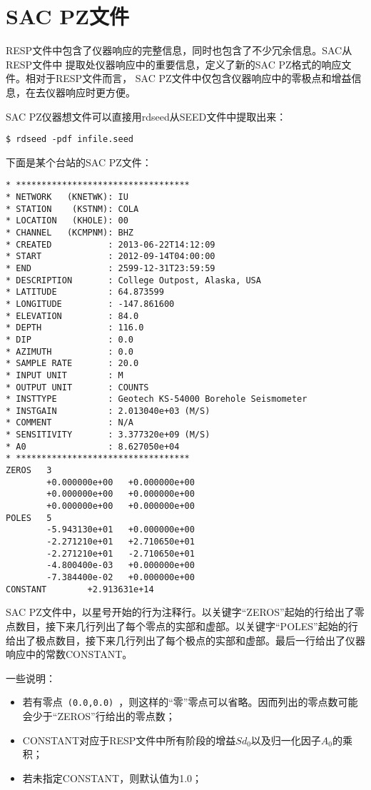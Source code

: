 \section{SAC PZ文件}
RESP文件中包含了仪器响应的完整信息，同时也包含了不少冗余信息。SAC从RESP文件中
提取处仪器响应中的重要信息，定义了新的SAC PZ格式的响应文件。相对于RESP文件而言，
SAC PZ文件中仅包含仪器响应中的零极点和增益信息，在去仪器响应时更方便。

SAC PZ仪器想文件可以直接用rdseed从SEED文件中提取出来：
\begin{verbatim}
$ rdseed -pdf infile.seed
\end{verbatim}

下面是某个台站的SAC PZ文件：
\begin{verbatim}
* **********************************
* NETWORK   (KNETWK): IU
* STATION    (KSTNM): COLA
* LOCATION   (KHOLE): 00
* CHANNEL   (KCMPNM): BHZ
* CREATED           : 2013-06-22T14:12:09
* START             : 2012-09-14T04:00:00
* END               : 2599-12-31T23:59:59
* DESCRIPTION       : College Outpost, Alaska, USA
* LATITUDE          : 64.873599
* LONGITUDE         : -147.861600
* ELEVATION         : 84.0
* DEPTH             : 116.0
* DIP               : 0.0
* AZIMUTH           : 0.0
* SAMPLE RATE       : 20.0
* INPUT UNIT        : M
* OUTPUT UNIT       : COUNTS
* INSTTYPE          : Geotech KS-54000 Borehole Seismometer
* INSTGAIN          : 2.013040e+03 (M/S)
* COMMENT           : N/A
* SENSITIVITY       : 3.377320e+09 (M/S)
* A0                : 8.627050e+04
* **********************************
ZEROS   3
        +0.000000e+00   +0.000000e+00
        +0.000000e+00   +0.000000e+00
        +0.000000e+00   +0.000000e+00
POLES   5
        -5.943130e+01   +0.000000e+00
        -2.271210e+01   +2.710650e+01
        -2.271210e+01   -2.710650e+01
        -4.800400e-03   +0.000000e+00
        -7.384400e-02   +0.000000e+00
CONSTANT        +2.913631e+14
\end{verbatim}

SAC PZ文件中，以星号开始的行为注释行。以关键字``ZEROS''起始的行给出了零点数目，接下来几行列出了每个零点的实部和虚部。以关键字``POLES''起始的行给出了极点数目，接下来几行列出了每个极点的实部和虚部。最后一行给出了仪器响应中的常数CONSTANT。

一些说明：
\begin{itemize}
\item 若有零点~\verb+(0.0,0.0)+~，则这样的``零''零点可以省略。因而列出的零点数可能会少于``ZEROS''行给出的零点数；
\item CONSTANT对应于RESP文件中所有阶段的增益$Sd_0$以及归一化因子$A_0$的乘积；
\item 若未指定CONSTANT，则默认值为1.0；
\end{itemize}
